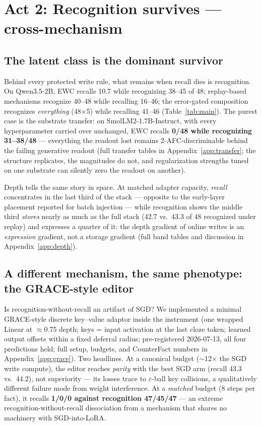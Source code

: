 \documentclass[11pt]{article}
\newcommand{\qwen}{Qwen3.5-2B}
\newcommand{\smol}{SmolLM2-1.7B-Instruct}
\begin{document}
\section{Act 2: Recognition survives --- cross-mechanism}\label{sec:act2}

\subsection{The latent class is the dominant survivor}\label{sec:latent}

Behind every protected write rule, what remains when recall dies is recognition. On \qwen{},
EWC recalls 10.7 while recognizing 38--45 of 48; replay-based mechanisms recognize 40--48 while
recalling 16--46; the error-gated composition recognizes \emph{everything} (48$\times$5) while
recalling 41--46 (Table~\ref{tab:main}). The purest case is the substrate transfer: on \smol{},
with every hyperparameter carried over unchanged, EWC recalls \textbf{0/48 while recognizing
31--38/48} --- everything the readout lost remains 2-AFC-discriminable behind the failing
generative readout (full transfer tables in Appendix~\ref{app:transfer}; the structure
replicates, the magnitudes do not, and regularization strengths tuned on one substrate can
silently zero the readout on another).

Depth tells the same story in space. At matched adapter capacity, \emph{recall} concentrates in
the last third of the stack --- opposite to the early-layer placement reported for batch
injection \citep{back2026lora} --- while recognition shows the middle third \emph{stores} nearly
as much as the full stack (42.7 vs.\ 43.3 of 48 recognized under replay) and expresses a quarter
of it: the depth gradient of online writes is an \emph{expression} gradient, not a storage
gradient (full band tables and discussion in Appendix~\ref{app:depth}).

\subsection{A different mechanism, the same phenotype: the GRACE-style editor}\label{sec:grace}

Is recognition-without-recall an artifact of SGD? We implemented a minimal GRACE-style discrete
key--value adaptor \citep{hartvigsen2022grace} inside the instrument (one wrapped Linear at
$\approx$0.75 depth; keys = input activation at the last cloze token; learned output offsets
within a fixed deferral radius; pre-registered 2026-07-13, all four predictions held; full
setup, budgets, and CounterFact numbers in Appendix~\ref{app:grace}). Two headlines. At a
canonical budget ($\sim$12$\times$ the SGD write compute), the editor reaches \emph{parity} with
the best SGD arm (recall 43.3 vs.\ 44.2), not superiority --- its losses trace to $\varepsilon$-ball
key collisions, a qualitatively different failure mode from weight interference. At a
\emph{matched} budget (8 steps per fact), it recalls \textbf{1/0/0 against recognition
47/45/47} --- an extreme recognition-without-recall dissociation from a mechanism that shares no
machinery with SGD-into-LoRA.
\end{document}
